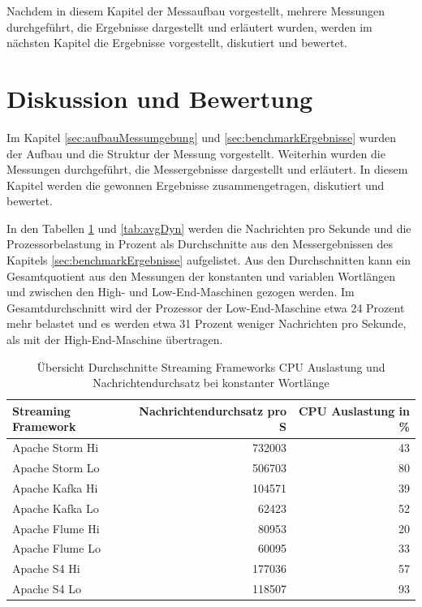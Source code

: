 Nachdem in diesem Kapitel der Messaufbau vorgestellt, mehrere Messungen durchgeführt, die Ergebnisse dargestellt und erläutert wurden, werden im nächsten Kapitel die Ergebnisse vorgestellt, diskutiert und bewertet.


\section{Diskussion und Bewertung}
\label{sec:diskussionUndBewertung}

Im Kapitel \ref{sec:aufbauMessumgebung} und \ref{sec:benchmarkErgebnisse} wurden der Aufbau und die Struktur der Messung vorgestellt. Weiterhin wurden die Messungen durchgeführt, die Messergebnisse dargestellt und erläutert. In diesem Kapitel werden die gewonnen Ergebnisse zusammengetragen, diskutiert und bewertet.

In den Tabellen \ref{tab:avgSta} und \ref{tab:avgDyn} werden die Nachrichten pro Sekunde und die Prozessorbelastung in Prozent als Durchschnitte aus den Messergebnissen des Kapitels \ref{sec:benchmarkErgebnisse} aufgelistet. Aus den Durchschnitten kann ein Gesamtquotient aus den Messungen der konstanten und variablen Wortlängen und zwischen den High- und Low-End-Maschinen gezogen werden. Im Gesamtdurchschnitt wird der Prozessor der Low-End-Maschine etwa 24 Prozent mehr belastet und es werden etwa 31 Prozent weniger Nachrichten pro Sekunde, als mit der High-End-Maschine übertragen.

\begin{table}[!ht]
	\centering
		\begin{tabular}{@{}lrr@{}} \toprule
			\textbf{Streaming Framework} & \textbf{Nachrichtendurchsatz pro S} & \textbf{CPU Auslastung in \%} \\ \midrule
			Apache Storm Hi & 732003 & 43 \\
			Apache Storm Lo & 506703 & 80 \\
			Apache Kafka Hi & 104571 & 39 \\
			Apache Kafka Lo & 62423 & 52 \\
			Apache Flume Hi & 80953 & 20 \\
			Apache Flume Lo & 60095 & 33 \\
			Apache S4 Hi & 177036 & 57 \\
			Apache S4 Lo & 118507 & 93 \\
			\bottomrule			
		\end{tabular}
	\caption{Übersicht Durchschnitte Streaming Frameworks CPU Auslastung und Nachrichtendurchsatz bei konstanter Wortlänge}
	\label{tab:avgSta}
\end{table}

